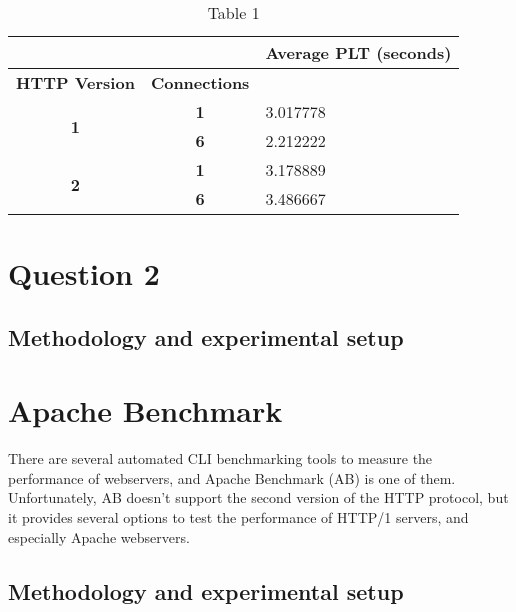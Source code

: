 \documentclass[a4paper,10pt]{article}
\begin{document}
\begin{table}[h!]
\centering
\begin{tabular}{|c|c|l|}
\hline
\multicolumn{1}{|r|}{\textbf{}} & \multicolumn{1}{l|}{} & \textbf{Average PLT (seconds)}         \\ \hline
\textbf{HTTP Version}          & \textbf{Connections}  & \multicolumn{1}{c|}{\textbf{}} \\ \hline
\multirow{2}{*}{\textbf{1}}     & \textbf{1}            & 3.017778                       \\ \cline{2-3} 
                                & \textbf{6}            & 2.212222                       \\ \hline
\multirow{2}{*}{\textbf{2}}     & \textbf{1}            & 3.178889                       \\ \cline{2-3} 
                                & \textbf{6}            & 3.486667                       \\ \hline
\end{tabular}
\caption{Table 1}
\label{fig:table1}

\end{table}



\section{Question 2}
\subsection{Methodology and experimental setup}



\section{Apache Benchmark}

There are several automated CLI benchmarking tools to measure the performance of webservers, and Apache Benchmark (AB) is one of them. Unfortunately, AB doesn't support the second version of the HTTP protocol, but it provides several options to test the performance of HTTP/1 servers, and especially Apache webservers.

\subsection{Methodology and experimental setup}
\end{document}
